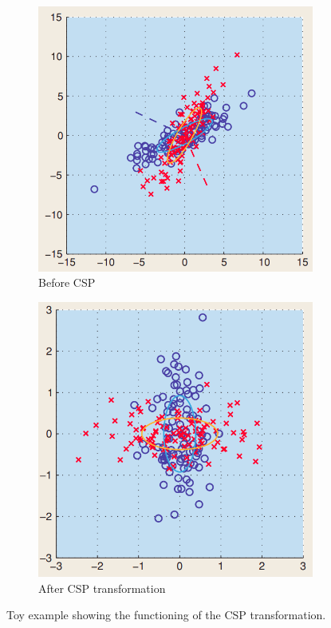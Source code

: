 \begin{figure}
    \centering
    \begin{subfigure}{.5\textwidth}
        \centering
        \includegraphics[width=1.\linewidth]{images_report/sensor/before_csp_filtering.png}
        \caption{Before CSP}
        \label{fig:before_csp}
    \end{subfigure}%
    \begin{subfigure}{.5\textwidth}
        \centering
        \includegraphics[width=1.\linewidth]{images_report/sensor/after_csp_filtering.png}
        \caption{After CSP transformation}
        \label{fig:after_csp}
    \end{subfigure}
    \caption{Toy example showing the functioning of the CSP transformation.}
    \label{fig:csp_intuitive}
\end{figure}

